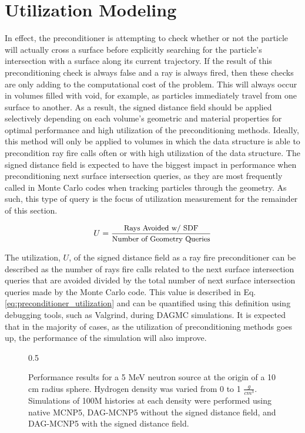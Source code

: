 \section{Utilization Modeling}\label{section:preconditioner_utilization}

In effect, the preconditioner is attempting to check whether or not the particle
will actually cross a surface before explicitly searching for the particle's
intersection with a surface along its current trajectory. If the result of this
preconditioning check is always false and a ray is always fired, then these
checks are only adding to the computational cost of the problem. This will
always occur in volumes filled with void, for example, as particles immediately
travel from one surface to another. As a result, the signed distance field
should be applied selectively depending on each volume's geometric and material
properties for optimal performance and high utilization of the preconditioning
methods. Ideally, this method will only be applied to volumes in which the data
structure is able to precondition ray fire calls often or with high utilization
of the data structure. The signed distance field is expected to have the biggest
impact in performance when preconditioning next surface intersection queries, as
they are most frequently called in Monte Carlo codes when tracking particles
through the geometry. As such, this type of query is the focus of utilization
measurement for the remainder of this section.

\begin{equation}
  U = \frac{ \small \text{Rays Avoided w/ SDF} }{ \small \text{Number of Geometry Queries} } 
   \label{eq:preconditioner_utilization}
\end{equation}

The utilization, $U$, of the signed distance field as a ray fire preconditioner can be
described as the number of rays fire calls related to the next surface
intersection queries that are avoided divided by the total number of next surface
intersection queries made by the Monte Carlo code. This value is described
in Eq. \ref{eq:preconditioner_utilization} and can be quantified using this
definition using debugging tools, such as Valgrind, during DAGMC simulations.
It is expected that in the majority of cases, as the utilization of preconditioning
methods goes up, the performance of the simulation will also improve.

\begin{figure}[ht]
  \centering
  {0.5\textwidth}
  \caption{Performance results for a 5 MeV neutron source at the origin of a 10
    cm radius sphere. Hydrogen density was varied from 0 to 1
    $\frac{g}{cm^3}$. Simulations of 100M histories at each density were
    performed using native MCNP5, DAG-MCNP5 without the signed distance field,
    and DAG-MCNP5 with the signed distance field.}
  \label{fig:sphere_hydrogen_density_study_perf}
\end{figure}

